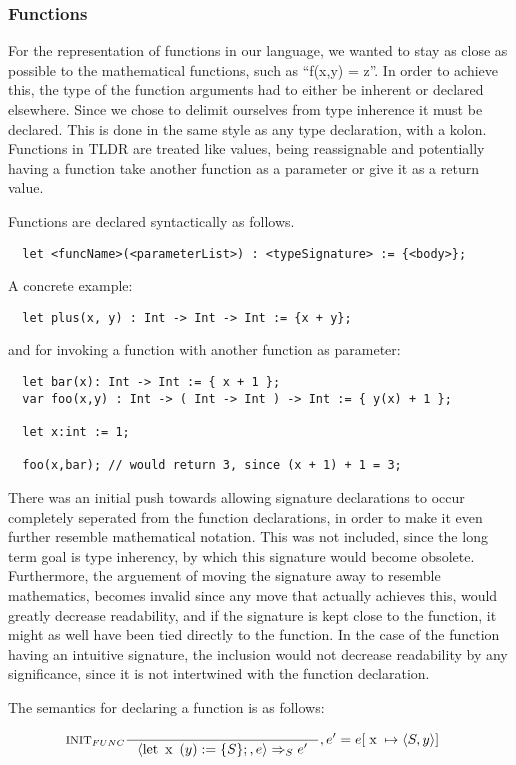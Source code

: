\subsubsection{Functions}
\label{subsec:functions}

For the representation of functions in our language, we wanted to stay as close as possible to the mathematical functions, such as \enquote{f(x,y) = z}. In order to achieve this, the type of the function arguments had to either be inherent or declared elsewhere. Since we chose to delimit ourselves from type inherence it must be declared. This is done in the same style as any type declaration, with a kolon. Functions in TLDR are treated like values, being reassignable and potentially having a function take another function as a parameter or give it as a return value.

Functions are declared syntactically as follows.

\begin{verbatim}
  let <funcName>(<parameterList>) : <typeSignature> := {<body>};
\end{verbatim}

A concrete example:

\begin{verbatim}
  let plus(x, y) : Int -> Int -> Int := {x + y};
\end{verbatim}

and for invoking a function with another function as parameter:

\begin{verbatim}
  let bar(x): Int -> Int := { x + 1 };
  var foo(x,y) : Int -> ( Int -> Int ) -> Int := { y(x) + 1 };

  let x:int := 1;

  foo(x,bar); // would return 3, since (x + 1) + 1 = 3;
\end{verbatim}

There was an initial push towards allowing signature declarations to occur completely seperated from the function declarations, in order to make it even further resemble mathematical notation. This was not included, since the long term goal is type inherency, by which this signature would become obsolete. Furthermore, the arguement of moving the signature away to resemble mathematics, becomes invalid since any move that actually achieves this, would greatly decrease readability, and if the signature is kept close to the function, it might as well have been tied directly to the function. In the case of the function having an intuitive signature, the inclusion would not decrease readability by any significance, since it is not intertwined with the function declaration.

The semantics for declaring a function is as follows:

\begin{align*}
&\inference[$\text{INIT}_{FUNC}$]{}
                         {\Braket{\Tlet \Tx(y) := \{S\};,e} \Rightarrow_S e'}
												 {, e' = e[\Tx \mapsto \Braket{S,y}]}
\end{align*}